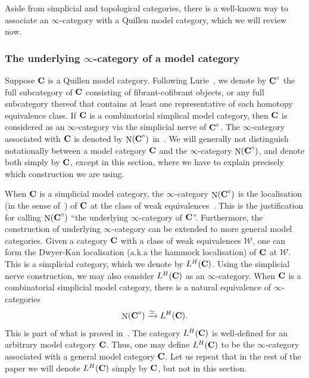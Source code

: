 \documentclass[psamsfonts]{amsart}
\theoremstyle{plain}
\theoremstyle{definition}
\theoremstyle{remark}
\newcommand{\catname}[1]{{\normalfont\textbf{#1}}}
\newcommand{\DK}{L^H}
\DeclareMathOperator{\Nerve}{N}
\begin{document}
Aside from simplicial and topological categories, there is a well-known way to associate an $\infty$-category with a Quillen model category, which we will review now.

\subsubsection*{The underlying $\infty$-category of a model category} \label{section:model-to-infinity} Suppose $\catname{C}$ is a Quillen model category. Following Lurie~\cite{LurieHTT}, we denote by $\catname{C}^\circ$ the full subcategory of $\catname{C}$ consisting of fibrant-cofibrant objects, or any full subcategory thereof that contains at least one representative of each homotopy equivalence class. If $\catname{C}$ is a combinatorial simplical model category, then $\catname{C}$ is considered as an $\infty$-category via the simplicial nerve of $\catname{C}^\circ$. The $\infty$-category associated with $\catname{C}$ is denoted by $\Nerve(\catname{C}^{\circ})$ in~\cite[Appendix A.2]{LurieHTT}. We will generally not distinguish notationally between a model category $\catname{C}$ and the $\infty$-category $\Nerve(\catname{C}^{\circ})$, and denote both simply by $\catname{C}$, except in this section, where we have to explain precisely which construction we are using.

When $\catname{C}$ is a simplicial model category, the $\infty$-category $\Nerve(\catname{C}^{\circ})$ is the localisation (in the sense of~\cite[Definition 1.3.4.1]{LurieHA}) of $\catname{C}$ at the class of weak equivalences~\cite[Theorem 1.3.4.20 + Remark 1.3.4.16]{LurieHA}. This is the justification for calling $\Nerve(\catname{C}^{\circ})$ ``the underlying $\infty$-category of $\catname{C}$''. Furthermore, the construction of underlying $\infty$-category can be extended to more general model categories. Given a category $\catname{C}$ with a class of weak equivalences $\mathcal W$, one can form the Dwyer-Kan localisation (a.k.a the hammock localisation) of $\catname{C}$ at $\mathcal W$. This is a simplicial category, which we denote by $\DK(\catname{C})$. Using the simplicial nerve construction, we may also consider $\DK(\catname{C})$ as an $\infty$-category. When $\catname{C}$ is a combinatorial simplicial model category, there is a natural equivalence of $\infty$-categories 
\begin{equation}\label{eq: equivalence} 
\Nerve(\catname{C}^\circ)\xrightarrow{\simeq} \DK(\catname{C}).
\end{equation}
This is part of what is proved in~\cite[Section 1.4.3]{HinichDK}. The category $\DK(\catname{C})$ is well-defined for an arbitrary model category $\catname{C}$. Thus, one may define $\DK(\catname{C})$ to be the $\infty$-category associated with a general model category $\catname{C}$. Let us repeat that in the rest of the paper we will denote $\DK(\catname{C})$  simply by $\catname{C}$, but not in this section.
\end{document}
